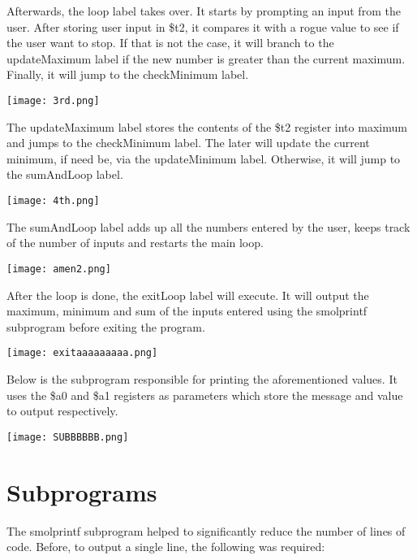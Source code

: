 \documentclass{article}
\begin{document}
Afterwards, the loop label takes over. It starts by prompting an input
from the user. After storing user input in \$t2, it compares it with a 
rogue value to see if the user want to stop. If that is not the
case, it will branch to the updateMaximum label if the new number
is greater than the current maximum. Finally, it will jump to
the checkMinimum label.

\begin{center}
  \texttt{[image: 3rd.png]}
\end{center}

The updateMaximum label stores the contents of the \$t2 register into
maximum and jumps to the checkMinimum label. The later will update the
current minimum, if need be, via the updateMinimum label. Otherwise,
it will jump to the sumAndLoop label.

\begin{center}
  \texttt{[image: 4th.png]}
\end{center}

The sumAndLoop label adds up all the numbers entered by the user,
keeps track of the number of inputs and restarts the main loop.

\begin{center}
  \texttt{[image: amen2.png]}
\end{center}

After the loop is done, the exitLoop label will execute. It will
output the maximum, minimum and sum of the inputs entered using the 
smolprintf subprogram before exiting the program.

\begin{center}
  \texttt{[image: exitaaaaaaaaa.png]}
\end{center}

Below is the subprogram responsible for printing the aforementioned
values. It uses the \$a0 and \$a1 registers as parameters which store
the message and value to output respectively.

\begin{center}
  \texttt{[image: SUBBBBBB.png]}
\end{center}

\section{Subprograms}
The smolprintf subprogram helped to significantly reduce the number
of lines of code. Before, to output a single line, the following was
required:
\end{document}
